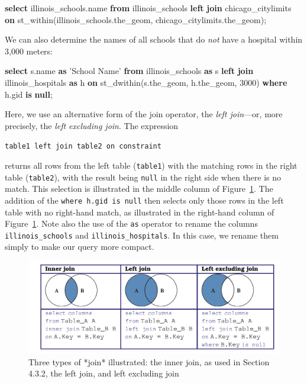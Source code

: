 \documentclass[]{krantz}
\newenvironment{Shaded}{\begin{snugshade}}{\end{snugshade}}
\newcommand{\KeywordTok}[1]{\textcolor[rgb]{0.13,0.29,0.53}{\textbf{#1}}}
\newcommand{\DecValTok}[1]{\textcolor[rgb]{0.00,0.00,0.81}{#1}}
\newcommand{\StringTok}[1]{\textcolor[rgb]{0.31,0.60,0.02}{#1}}
\newcommand{\NormalTok}[1]{#1}
\begin{document}
\begin{Shaded}
\begin{Highlighting}[]
\KeywordTok{select}\NormalTok{ illinois_schools.name}
  \KeywordTok{from}\NormalTok{ illinois_schools }\KeywordTok{left} \KeywordTok{join}\NormalTok{ chicago_citylimits}
  \KeywordTok{on}\NormalTok{ st_within(illinois_schools.the_geom,}
\NormalTok{                  chicago_citylimits.the_geom);}
\end{Highlighting}
\end{Shaded}

We can also determine the names of all schools that do \emph{not} have a
hospital within 3,000 meters:

\begin{Shaded}
\begin{Highlighting}[]
\KeywordTok{select}\NormalTok{ s.name }\KeywordTok{as} \StringTok{'School Name'}
    \KeywordTok{from}\NormalTok{ illinois_schools }\KeywordTok{as}\NormalTok{ s}
        \KeywordTok{left} \KeywordTok{join}\NormalTok{ illinois_hospitals }\KeywordTok{as}\NormalTok{ h}
          \KeywordTok{on}\NormalTok{ st_dwithin(s.the_geom, h.the_geom, }\DecValTok{3000}\NormalTok{)}
    \KeywordTok{where}\NormalTok{ h.gid }\KeywordTok{is} \KeywordTok{null}\NormalTok{;}
\end{Highlighting}
\end{Shaded}

Here, we use an alternative form of the join operator, the \emph{left
join}---or, more precisely, the \emph{left excluding join}. The
expression

\texttt{table1\ left\ join\ table2\ on\ constraint}

returns all rows from the left table (\texttt{table1}) with the matching
rows in the right table (\texttt{table2}), with the result being
\texttt{null} in the right side when there is no match. This selection
is illustrated in the middle column of Figure~\ref{fig:fig-venn}. The
addition of the \texttt{where\ h.gid\ is\ null} then selects only those
rows in the left table with no right-hand match, as illustrated in the
right-hand column of Figure~\ref{fig:fig-venn}. Note also the use of the
\texttt{as} operator to rename the columns \texttt{illinois\_schools}
and \texttt{illinois\_hospitals}. In this case, we rename them simply to
make our query more compact.

\begin{figure}

{\centering \includegraphics[width=0.7\linewidth]{ChapterDB/figures/fig-venn} 

}

\caption{Three types of *join* illustrated: the inner join, as used in Section 4.3.2, the left join, and left excluding join}\label{fig:fig-venn}
\end{figure}
\end{document}
